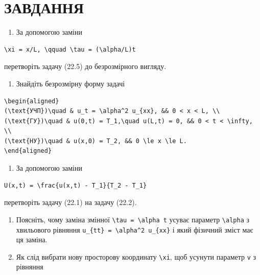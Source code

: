 \documentclass[
  ukrainian,
]{article}
\providecommand{\tightlist}{%
  \setlength{\itemsep}{0pt}\setlength{\parskip}{0pt}}
\begin{document}
\section{ЗАВДАННЯ}\label{ux437ux430ux432ux434ux430ux43dux43dux44f}

\begin{enumerate}
\def\labelenumi{\arabic{enumi}.}
\tightlist
\item
  За допомогою заміни
\end{enumerate}

\begin{verbatim}
\xi = x/L, \qquad \tau = (\alpha/L)t
\end{verbatim}

перетворіть задачу (22.5) до безрозмірного вигляду.

\begin{enumerate}
\def\labelenumi{\arabic{enumi}.}
\setcounter{enumi}{1}
\tightlist
\item
  Знайдіть безрозмірну форму задачі
\end{enumerate}

\begin{verbatim}
\begin{aligned}
(\text{УЧП})\quad & u_t = \alpha^2 u_{xx}, && 0 < x < L, \\
(\text{ГУ})\quad & u(0,t) = T_1,\quad u(L,t) = 0, && 0 < t < \infty, \\
(\text{НУ})\quad & u(x,0) = T_2, && 0 \le x \le L.
\end{aligned}
\end{verbatim}

\begin{enumerate}
\def\labelenumi{\arabic{enumi}.}
\setcounter{enumi}{2}
\tightlist
\item
  За допомогою заміни
\end{enumerate}

\begin{verbatim}
U(x,t) = \frac{u(x,t) - T_1}{T_2 - T_1}
\end{verbatim}

перетворіть задачу (22.1) на задачу (22.2).

\begin{enumerate}
\def\labelenumi{\arabic{enumi}.}
\setcounter{enumi}{3}
\item
  Поясніть, чому заміна змінної
  \texttt{\textbackslash{}tau\ =\ \textbackslash{}alpha\ t} усуває
  параметр \texttt{\textbackslash{}alpha} з хвильового рівняння
  \texttt{u\_\{tt\}\ =\ \textbackslash{}alpha\^{}2\ u\_\{xx\}} і який
  фізичний зміст має ця заміна.
\item
  Як слід вибрати нову просторову координату
  \texttt{\textbackslash{}xi}, щоб усунути параметр \texttt{v} з
  рівняння
\end{enumerate}
\end{document}
